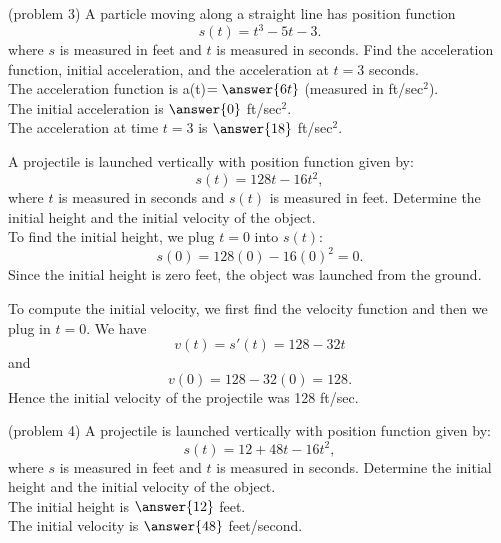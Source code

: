 \documentclass[handout]{ximera}
\begin{document}
\begin{problem}(problem 3)
A particle moving along a straight line has position function
\[s(t) = t^3 - 5t -3.\]
where $s$ is measured in feet and $t$ is measured in seconds.
Find the acceleration function, initial acceleration, and the acceleration at $t = 3$ seconds.\\

The acceleration function is a(t)$ = \answer{6t}$ (measured in ft/sec$^2$).\\
The initial acceleration is $\answer{0}$ ft/sec$^2$.\\
The acceleration at time $t=3$ is $\answer{18}$ ft/sec$^2$.


\end{problem}



\begin{example}[example 4]
A projectile is launched vertically with position function given by:
\[s(t) = 128t - 16t^2,\]
where $t$ is measured in seconds and $s(t)$ is measured in feet.
Determine the initial height and the initial velocity of the object.\\

To find the initial height, we plug $t = 0$ into $s(t)$:
\[s(0) = 128(0) - 16(0)^2 = 0.\]
Since the initial height is zero feet, the object was launched from the ground.

To compute the initial velocity, we first find the velocity function and then we plug in $t=0$.
We have
\[v(t) = s'(t) = 128 - 32t\]
and 
\[v(0) = 128 - 32(0) = 128.\]
Hence the initial velocity of the projectile was 128 ft/sec.

\end{example}


\begin{problem} (problem 4)
A projectile is launched vertically with position function given by:
\[s(t) = 12 + 48t - 16t^2,\]
where $s$ is measured in feet and $t$ is measured in seconds.
Determine the initial height and the initial velocity of the object.\\

The initial height is $\answer{12}$ feet.\\
The initial velocity is $\answer{48}$ feet/second.

\end{problem}
\end{document}
